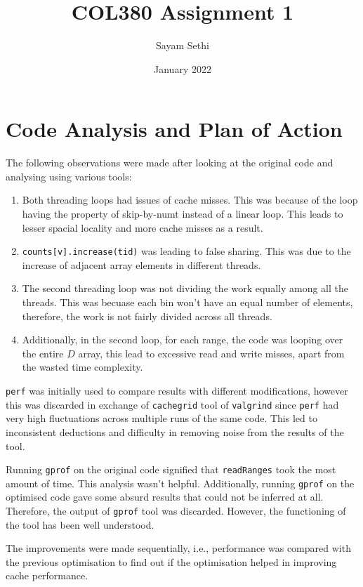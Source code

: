 \documentclass[11pt]{article}
\title{COL380 Assignment 1}
\author{Sayam Sethi}
\date{January 2022}
\begin{document}
\maketitle

\tableofcontents

\section{Code Analysis and Plan of Action}
The following observations were made after looking at the original code and analysing using various tools:
\begin{enumerate}
	\item Both threading loops had issues of cache misses. This was because of the loop having the property of skip-by-numt instead of a linear loop. This leads to lesser spacial locality and more cache misses as a result.
	\item \texttt{counts[v].increase(tid)} was leading to false sharing. This was due to the increase of adjacent array elements in different threads.
	\item The second threading loop was not dividing the work equally among all the threads. This was becuase each bin won't have an equal number of elements, therefore, the work is not fairly divided across all threads.
	\item Additionally, in the second loop, for each range, the code was looping over the entire $D$ array, this lead to excessive read and write misses, apart from the wasted time complexity.
\end{enumerate}
\texttt{perf} was initially used to compare results with different modifications, however this was discarded in exchange of \texttt{cachegrid} tool of \texttt{valgrind} since \texttt{perf} had very high fluctuations across multiple runs of the same code. This led to inconsistent deductions and difficulty in removing noise from the results of the tool.\par
Running \texttt{gprof} on the original code signified that \texttt{readRanges} took the most amount of time. This analysis wasn't helpful. Additionally, running \texttt{gprof} on the optimised code gave some absurd results that could not be inferred at all. Therefore, the output of \texttt{gprof} tool was discarded. However, the functioning of the tool has been well understood.\par
The improvements were made sequentially, i.e., performance was compared with the previous optimisation to find out if the optimisation helped in improving cache performance.
\end{document}
